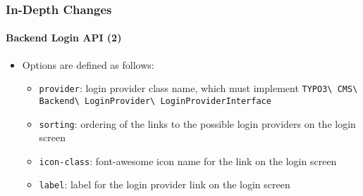 \begin{frame}[fragile]
	\frametitle{In-Depth Changes}
	\framesubtitle{Backend Login API (2)}

	\begin{itemize}

		\item Options are defined as follows:

			\begin{itemize}

				\item \texttt{provider}:\newline
					login provider class name, which must implement
						\texttt{TYPO3\textbackslash
							CMS\textbackslash
							Backend\textbackslash
							LoginProvider\textbackslash
							LoginProviderInterface}

				\item \texttt{sorting}:\newline
					ordering of the links to the possible login providers on the login screen

				\item \texttt{icon-class}:\newline
					font-awesome icon name for the link on the login screen

				\item \texttt{label}:\newline
					label for the login provider link on the login screen
			\end{itemize}

	\end{itemize}

\end{frame}


